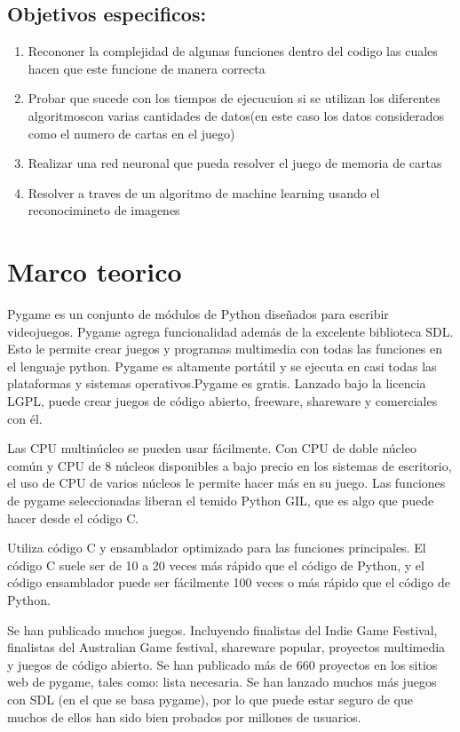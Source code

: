 \documentclass[10pt,twocolumn]{article}
\begin{document}
\subsection{Objetivos especificos:}
 \begin{enumerate}
    
    \item Recononer la complejidad de algunas funciones dentro del codigo las cuales hacen que este funcione de manera correcta
    \item Probar que sucede con los tiempos de ejecucuion si se utilizan los diferentes algoritmoscon varias cantidades de datos(en este caso los datos considerados como el numero de cartas en el juego)
    \item Realizar una red neuronal que pueda resolver el juego de memoria de cartas
    \item Resolver a traves de un algoritmo de machine learning usando el reconocimineto de imagenes
\end{enumerate}

\section{Marco teorico}

Pygame es un conjunto de módulos de Python diseñados para escribir videojuegos. Pygame agrega funcionalidad además de la excelente biblioteca SDL. Esto le permite crear juegos y programas multimedia con todas las funciones en el lenguaje python. Pygame es altamente portátil y se ejecuta en casi todas las plataformas y sistemas operativos.Pygame es gratis. Lanzado bajo la licencia LGPL, puede crear juegos de código abierto, freeware, shareware y comerciales con él.

 Las CPU multinúcleo se pueden usar fácilmente. Con CPU de doble núcleo común y CPU de 8 núcleos disponibles a bajo precio en los sistemas de escritorio, el uso de CPU de varios núcleos le permite hacer más en su juego. Las funciones de pygame seleccionadas liberan el temido Python GIL, que es algo que puede hacer desde el código C.

Utiliza código C y ensamblador optimizado para las funciones principales. El código C suele ser de 10 a 20 veces más rápido que el código de Python, y el código ensamblador puede ser fácilmente 100 veces o más rápido que el código de Python.

Se han publicado muchos juegos. Incluyendo finalistas del Indie Game Festival, finalistas del Australian Game festival, shareware popular, proyectos multimedia y juegos de código abierto. Se han publicado más de 660 proyectos en los sitios web de pygame, tales como: lista necesaria. Se han lanzado muchos más juegos con SDL (en el que se basa pygame), por lo que puede estar seguro de que muchos de ellos han sido bien probados por millones de usuarios.
\end{document}
